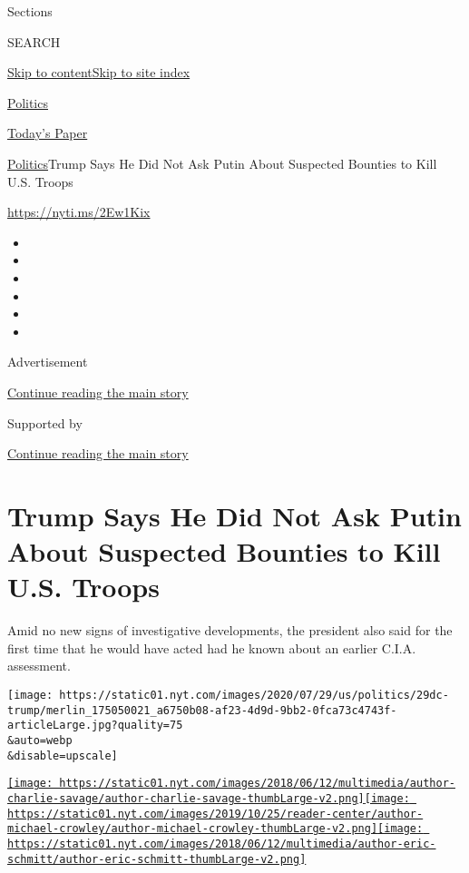 Sections

SEARCH

\protect\hyperlink{site-content}{Skip to
content}\protect\hyperlink{site-index}{Skip to site index}

\href{https://www.nytimes.com/section/politics}{Politics}

\href{https://myaccount.nytimes.com/auth/login?response_type=cookie\&client_id=vi}{}

\href{https://www.nytimes.com/section/todayspaper}{Today's Paper}

\href{/section/politics}{Politics}\textbar{}Trump Says He Did Not Ask
Putin About Suspected Bounties to Kill U.S. Troops

\url{https://nyti.ms/2Ew1Kix}

\begin{itemize}
\item
\item
\item
\item
\item
\item
\end{itemize}

Advertisement

\protect\hyperlink{after-top}{Continue reading the main story}

Supported by

\protect\hyperlink{after-sponsor}{Continue reading the main story}

\hypertarget{trump-says-he-did-not-ask-putin-about-suspected-bounties-to-kill-us-troops}{%
\section{Trump Says He Did Not Ask Putin About Suspected Bounties to
Kill U.S.
Troops}\label{trump-says-he-did-not-ask-putin-about-suspected-bounties-to-kill-us-troops}}

Amid no new signs of investigative developments, the president also said
for the first time that he would have acted had he known about an
earlier C.I.A. assessment.

\texttt{[image: https://static01.nyt.com/images/2020/07/29/us/politics/29dc-trump/merlin\_175050021\_a6750b08-af23-4d9d-9bb2-0fca73c4743f-articleLarge.jpg?quality=75\\\&auto=webp\\\&disable=upscale]}

\href{https://www.nytimes.com/by/charlie-savage}{\texttt{[image: https://static01.nyt.com/images/2018/06/12/multimedia/author-charlie-savage/author-charlie-savage-thumbLarge-v2.png]}}\href{https://www.nytimes.com/by/michael-crowley}{\texttt{[image: https://static01.nyt.com/images/2019/10/25/reader-center/author-michael-crowley/author-michael-crowley-thumbLarge-v2.png]}}\href{https://www.nytimes.com/by/eric-schmitt}{\texttt{[image: https://static01.nyt.com/images/2018/06/12/multimedia/author-eric-schmitt/author-eric-schmitt-thumbLarge-v2.png]}}

